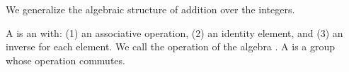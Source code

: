 \sbasic


\sstart



We generalize the algebraic structure of
addition over the integers.


A  is an
 with:
(1) an associative operation,
(2) an identity element, and
(3) an inverse for each element.
We call the operation of the algebra
.
A 
is a group whose operation commutes.




\strats
